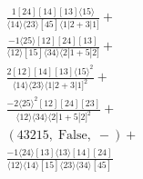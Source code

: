 \documentclass[varwidth, border=5pt]{standalone}
\begin{document}
\begin{my}
$\begin{gathered}
\scriptscriptstyle\frac{1[24][14][13]⟨15⟩}{⟨14⟩⟨23⟩[45]⟨1|2+3|1]}+\\
\scriptscriptstyle\frac{-1⟨25⟩[12][24][13]}{⟨12⟩[15]⟨34⟩⟨2|1+5|2]}+\\
\scriptscriptstyle\frac{2[12][14][13]⟨15⟩^2}{⟨14⟩⟨23⟩⟨1|2+3|1]^2}+\\
\scriptscriptstyle\frac{-2⟨25⟩^2[12][24][23]}{⟨12⟩⟨34⟩⟨2|1+5|2]^2}+\\
\scriptscriptstyle(43215,\;\text{False},\;-)+\\
\scriptscriptstyle\frac{-1⟨24⟩[13]⟨13⟩[14][24]}{⟨12⟩⟨14⟩[15]⟨23⟩⟨34⟩[45]}\phantom{+}
\end{gathered}$
\end{my}
\end{document}
